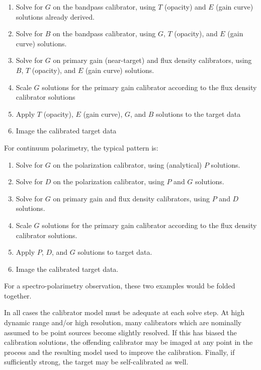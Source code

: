 \begin{enumerate}
   \item Solve for $G$ on the bandpass calibrator, using $T$ (opacity)
      and $E$ (gain curve) solutions already derived. 
   \item Solve for $B$ on the bandpass calibrator, using $G$, $T$
      (opacity), and $E$ (gain curve) solutions. 
   \item Solve for $G$ on primary gain (near-target) and flux density
      calibrators, using $B$, $T$ (opacity), and $E$ (gain curve)
      solutions. 
   \item Scale $G$ solutions for the primary gain calibrator according to
      the flux density calibrator solutions 
   \item Apply $T$ (opacity), $E$ (gain curve), $G$, and $B$ solutions
      to the target data 
   \item Image the calibrated target data 
\end{enumerate}

For continuum polarimetry, the typical pattern is:

\begin{enumerate}
   \item Solve for $G$ on the polarization calibrator, using (analytical)
      $P$ solutions. 
   \item Solve for $D$ on the polarization calibrator, using $P$ and $G$
      solutions. 
   \item Solve for $G$ on primary gain and flux density calibrators,
      using $P$ and $D$ solutions. 
   \item Scale $G$ solutions for the primary gain calibrator according to
      the flux density calibrator solutions. 
   \item Apply $P$, $D$, and $G$ solutions to target data.
   \item Image the calibrated target data. 
\end{enumerate}

For a spectro-polarimetry observation, these two examples would be
folded together. 

In all cases the calibrator model must be adequate at each solve
step. At high dynamic range and/or high resolution, many calibrators
which are nominally assumed to be point sources become slightly
resolved. If this has biased the calibration solutions, the offending
calibrator may be imaged at any point in the process and the resulting
model used to improve the calibration. Finally, if sufficiently
strong, the target may be self-calibrated as well. 

